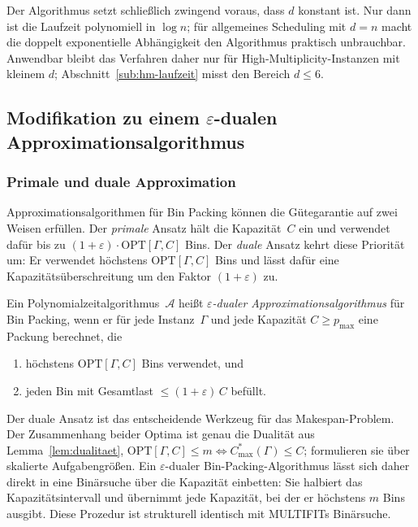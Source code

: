 Der Algorithmus setzt schließlich zwingend voraus, dass $d$ konstant ist.
Nur dann ist die Laufzeit polynomiell in $\log n$; für allgemeines Scheduling mit $d = n$ macht
die doppelt exponentielle Abhängigkeit den Algorithmus praktisch unbrauchbar.
Anwendbar bleibt das Verfahren daher nur für High-Multiplicity-Instanzen mit kleinem $d$;
Abschnitt~\ref{sub:hm-laufzeit} misst den Bereich $d \le 6$.

\subsection{Modifikation zu einem \texorpdfstring{$\varepsilon$}{ε}-dualen Approximationsalgorithmus}
\label{sub:eps_dual}

\subsubsection{Primale und duale Approximation}

Approximationsalgorithmen für Bin Packing können die Gütegarantie auf zwei Weisen erfüllen.
Der \emph{primale} Ansatz hält die Kapazität~$C$ ein und verwendet dafür bis zu
$(1+\varepsilon)\cdot\mathrm{OPT}[\Gamma, C]$ Bins.
Der \emph{duale} Ansatz kehrt diese Priorität um: Er verwendet höchstens
$\mathrm{OPT}[\Gamma, C]$ Bins und lässt dafür eine Kapazitätsüberschreitung um den
Faktor $(1+\varepsilon)$ zu.

\begin{definition}
\label{def:eps-dual}
  Ein Polynomialzeitalgorithmus~$\mathcal{A}$ heißt \emph{$\varepsilon$-dualer Approxi\-mationsalgorithmus}
  für Bin Packing, wenn er für jede Instanz~$\Gamma$ und jede Kapazität $C \ge p_{\max}$ eine
  Packung berechnet, die
  \begin{enumerate}[label=(\roman*)]
    \item höchstens $\mathrm{OPT}[\Gamma, C]$ Bins verwendet, und
    \item jeden Bin mit Gesamtlast $\le (1+\varepsilon)\, C$ befüllt.
  \end{enumerate}
\end{definition}

Der duale Ansatz ist das entscheidende Werkzeug für das Makespan-Problem.
Der Zusammenhang beider Optima ist genau die Dualität aus Lemma~\ref{lem:dualitaet},
$\mathrm{OPT}[\Gamma, C] \le m \iff C^{*}_{\max}(\Gamma) \le C$;
\textcite{hochbaum_shmoys_1987} formulieren sie über skalierte Aufgabengrößen.
Ein $\varepsilon$-dualer Bin-Packing-Algorithmus lässt sich daher direkt in eine Binärsuche über
die Kapazität einbetten: Sie halbiert das Kapazitätsintervall und übernimmt jede Kapazität, bei
der er höchstens $m$ Bins ausgibt.
Diese Prozedur ist strukturell identisch mit MULTIFITs Binärsuche.

